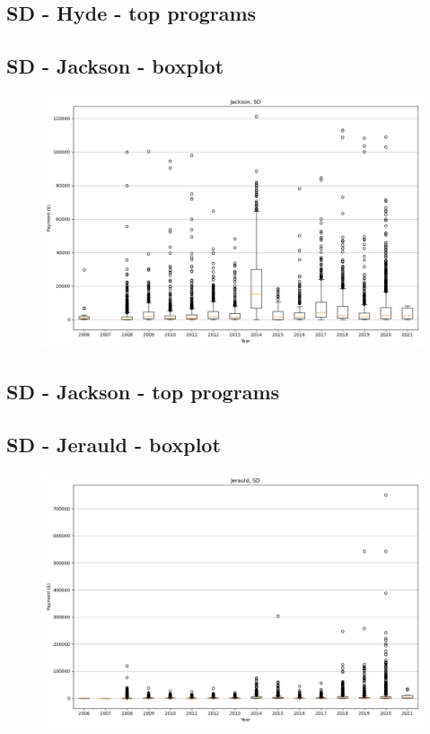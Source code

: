 \subsection*{SD - Hyde - top programs}

\newpage
\subsection*{SD - Jackson - boxplot}
\begin{figure}[h]
\centering
\includegraphics[width=7in]{../output/boxplots/counties/Jackson-SD_boxplot.png}
\end{figure}


\subsection*{SD - Jackson - top programs}

\newpage
\subsection*{SD - Jerauld - boxplot}
\begin{figure}[h]
\centering
\includegraphics[width=7in]{../output/boxplots/counties/Jerauld-SD_boxplot.png}
\end{figure}


